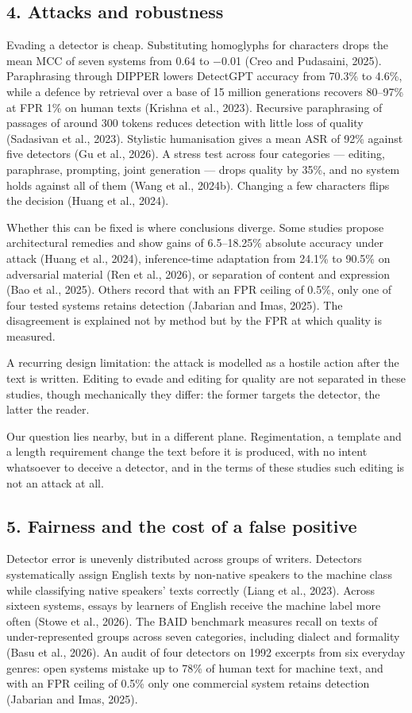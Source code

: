 \documentclass[11pt,a4paper]{article}
\renewcommand{\_}{\textunderscore\allowbreak}
\begin{document}
\subsection{4. Attacks and robustness}

Evading a detector is cheap. Substituting homoglyphs for characters drops the mean MCC
of seven systems from 0.64 to $-$0.01 (Creo and Pudasaini, 2025). Paraphrasing through DIPPER lowers
DetectGPT accuracy from 70.3\% to 4.6\%, while a defence by retrieval over a base of 15 million generations
recovers 80–97\% at FPR 1\% on human texts (Krishna et al., 2023). Recursive paraphrasing of
passages of around 300 tokens reduces detection with little loss of quality (Sadasivan et al., 2023).
Stylistic humanisation gives a mean ASR of 92\% against five detectors (Gu et al., 2026).
A stress test across four categories — editing, paraphrase, prompting, joint
generation — drops quality by 35\%, and no system holds against all of them
(Wang et al., 2024b). Changing a few characters flips the decision (Huang et al., 2024).

Whether this can be fixed is where conclusions diverge. Some studies propose
architectural remedies and show gains of 6.5–18.25\% absolute accuracy under attack (Huang et al., 2024),
inference-time adaptation from 24.1\% to 90.5\% on adversarial material (Ren et al., 2026), or
separation of content and expression (Bao et al., 2025). Others record that with an FPR ceiling of
0.5\%, only one of four tested systems retains detection (Jabarian and Imas, 2025).
The disagreement is explained not by method but by the FPR at which quality is measured.

A recurring design limitation: the attack is modelled as a hostile action
after the text is written. Editing to evade and editing for quality are not
separated in these studies, though mechanically they differ: the former targets
the detector, the latter the reader.

Our question lies nearby, but in a different plane. Regimentation, a template
and a length requirement change the text before it is produced, with no intent
whatsoever to deceive a detector, and in the terms of these studies such editing
is not an attack at all.

\subsection{5. Fairness and the cost of a false positive}

Detector error is unevenly distributed across groups of writers. Detectors
systematically assign English texts by non-native speakers to the machine class
while classifying native speakers' texts correctly (Liang et al., 2023). Across sixteen systems,
essays by learners of English receive the machine label more often (Stowe et al., 2026). The BAID benchmark measures recall on
texts of under-represented groups across seven categories, including dialect and
formality (Basu et al., 2026). An audit of four detectors on 1992 excerpts from six everyday
genres: open systems mistake up to 78\% of human text for machine text, and with
an FPR ceiling of 0.5\% only one commercial system retains detection (Jabarian and Imas, 2025).
\end{document}
